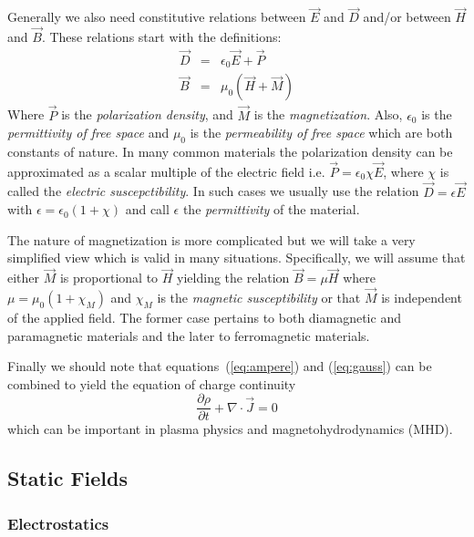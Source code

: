 \documentclass{article}
\newcommand{\refEq}[1]{(\ref{eq:#1})}
\newcommand{\Div}{\nabla\!\cdot\!}
\begin{document}
Generally we also need constitutive relations between $\vec{E}$ and
$\vec{D}$ and/or between $\vec{H}$ and $\vec{B}$.  These relations
start with the definitions:
\begin{eqnarray}
\vec{D} &=& \epsilon_0\vec{E} + \vec{P}\\
\vec{B} &=& \mu_0\left(\vec{H} + \vec{M}\right)
\end{eqnarray}
Where $\vec{P}$ is the {\em polarization density}, and $\vec{M}$ is
the {\em magnetization}.  Also, $\epsilon_0$ is the {\em permittivity
  of free space} and $\mu_0$ is the {\em permeability of free space}
which are both constants of nature.  In many common materials the
polarization density can be approximated as a scalar multiple of the
electric field i.e. $\vec{P}=\epsilon_0\chi\vec{E}$, where $\chi$ is
called the {\em electric suscepctibility}.  In such cases we usually
use the relation $\vec{D}=\epsilon\vec{E}$ with
$\epsilon=\epsilon_0(1+\chi)$ and call $\epsilon$ the {\em
  permittivity} of the material.

The nature of magnetization is more complicated but we will take a
very simplified view which is valid in many situations.  Specifically,
we will assume that either $\vec{M}$ is proportional to $\vec{H}$
yielding the relation $\vec{B}=\mu\vec{H}$ where $\mu=\mu_0(1+\chi_M)$
and $\chi_M$ is the {\em magnetic susceptibility} or that $\vec{M}$ is
independent of the applied field.  The former case pertains to both
diamagnetic and paramagnetic materials and the later to ferromagnetic
materials.

Finally we should note that equations~\refEq{ampere} and \refEq{gauss}
can be combined to yield the equation of charge continuity
\[\frac{\partial\rho}{\partial t}+\Div\vec{J} = 0\]
which can be important in plasma physics and magnetohydrodynamics (MHD).

\subsection{Static Fields}
\subsubsection{Electrostatics}
\end{document}
